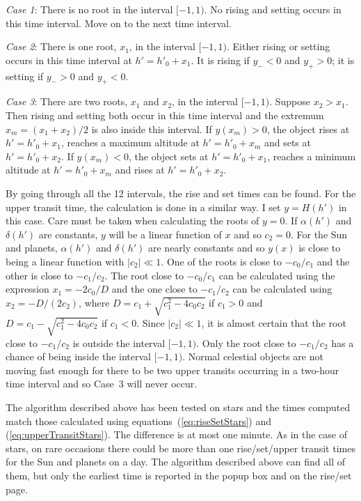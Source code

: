 \documentclass[12pt]{article}
\begin{document}
{\em Case 1}: There is no root in the interval $[-1,1)$. No rising and setting 
occurs in this time interval. Move on to the next time interval. 

{\em Case 2}: There is one root, $x_1$, in the interval $[-1,1)$. Either rising or 
setting occurs in this time interval at $h'=h'_0+x_1$. It is rising if $y_-<0$ and 
$y_+>0$; it is setting if $y_->0$ and $y_+<0$. 

{\em Case 3}: There are two roots, $x_1$ and $x_2$, in the interval $[-1,1)$. Suppose 
$x_2>x_1$. Then rising and setting both occur in this time interval and the extremum 
$x_m=(x_1+x_2)/2$ is also inside this interval. If $y(x_m) > 0$, the object rises 
at $h'=h'_0+x_1$, reaches a maximum altitude at $h'=h'_0+x_m$ and sets at 
$h'=h'_0+x_2$. If $y(x_m)<0$, the object sets at $h'=h'_0+x_1$, reaches 
a minimum altitude at $h'=h'_0+x_m$ and rises at $h'=h'_0+x_2$. 

By going through all the 12 intervals, the rise and set times can be found. 
For the upper transit time, the calculation is done in a similar way. I set 
$y = H(h')$ in this case. Care must be taken when calculating the roots of $y=0$. 
If $\alpha(h')$ and $\delta(h')$ are constants, $y$ will be a linear function of $x$ 
and so $c_2=0$. For the Sun and planets, $\alpha(h')$ and $\delta(h')$ 
are nearly constants and so $y(x)$ is close to being a linear function with $|c_2|\ll 1$. 
One of the roots is close to $-c_0/c_1$ and the other is close to $-c_1/c_2$. 
The root close to $-c_0/c_1$ can be calculated using the expression $x_1=-2c_0/D$ 
and the one close to $-c_1/c_2$ can be calculated using $x_2=-D/(2 c_2)$, where 
$D=c_1+\sqrt{c_1^2-4c_0c_2}$ if $c_1>0$ and $D=c_1-\sqrt{c_1^2-4c_0c_2}$ if $c_1<0$. 
Since $|c_2|\ll 1$, it is almost certain that the root close to $-c_1/c_2$ 
is outside the interval $[-1,1)$. Only the root close to $-c_1/c_2$ has a chance 
of being inside the interval $[-1,1)$. Normal celestial objects are not moving 
fast enough for there to be two upper transits occurring in a two-hour time interval 
and so Case~3 will never occur.

The algorithm described above has been tested on stars and the times computed 
match those calculated using equations~(\ref{eq:riseSetStars}) and 
(\ref{eq:upperTransitStars}). The difference is at most one minute.
As in the case of stars, on rare occasions there could be more than one 
rise/set/upper transit times for the Sun and planets on a day. The 
algorithm described above can find all of them, but only the earliest 
time is reported in the popup box and on the rise/set page.
\end{document}
